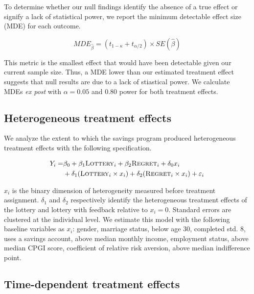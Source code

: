 \documentclass[11pt]{article}
\begin{document}
		To determine whether our null findings identify the absence of a true effect or signify a lack of statistical power, we report the minimum detectable effect size (MDE) for each outcome.

		\begin{equation}
			MDE_{\hat \beta} = (t_{1-\kappa} + t_{\alpha/2}) \times SE(\hat \beta)
		\label{eq:mde} \end{equation}

		This metric is the smallest effect that would have been detectable given our current sample size. Thus, a MDE lower than our estimated treatment effect suggests that null results are due to a lack of stiastical power. We calculate MDEs \textit{ex post} with $\alpha = 0.05$ and 0.80 power for both treatment effects.


	\subsection{Heterogeneous treatment effects}

		We analyze the extent to which the savings program produced heterogeneous treatment effects with the following specification.

		\begin{equation} \begin{split}
		Y_{i} = & \beta_{0} + \beta_{1}\text{\textsc{Lottery}}_{i} + \beta_{2}\text{\textsc{Regret}}_{i} + \delta_{0}x_{i} \\
					& + \delta_{1}(\text{\textsc{Lottery}}_{i} \times x_{i}) + \delta_{2}(\text{\textsc{Regret}}_{i} \times x_{i}) + \varepsilon_{i}
		\end{split} \label{eq:heteffect} \end{equation}

		$x_{i}$ is the binary dimension of heterogeneity measured before treatment assignment. $\delta_{1}$ and $\delta_{2}$ respectively identify the heterogeneous treatment effects of the lottery and lottery with feedback relative to $x_{i} = 0$. Standard errors are clustered at the individual level. We estimate this model with the following baseline variables as $x_{i}$: gender, marriage status, below age 30, completed std. 8, uses a savings account, above median monthly income, employment status, above median CPGI score, coefficient of relative risk aversion, above median indifference point.

	\subsection{Time-dependent treatment effects}
\end{document}
